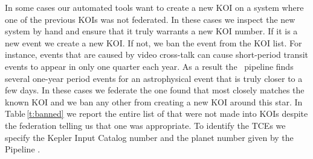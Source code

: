 In some cases our automated tools want to create a new KOI on a system where one of the previous KOIs was not federated.  In these cases we inspect the new system by hand and ensure that it truly warrants a new KOI number. If it is a new event we create a new KOI. If not, we ban the event from the KOI list.  For instance, events that are caused by video cross-talk \citep{KIH} can cause short-period transit events to appear in only one quarter each year. As a result the \Kepler\ pipeline finds several one-year period events for an astrophysical event that is truly closer to a few days.  In these cases we federate the one found that most closely matches the known KOI and we ban any other  from creating a new KOI around this star. In Table\,\ref{t:banned} we report the entire list of  that were not made into KOIs despite the federation telling us that one was appropriate. To identify the TCEs we specify the Kepler Input Catalog number and the planet number given by the \Kepler{} Pipeline \citep{Twicken2016}.


